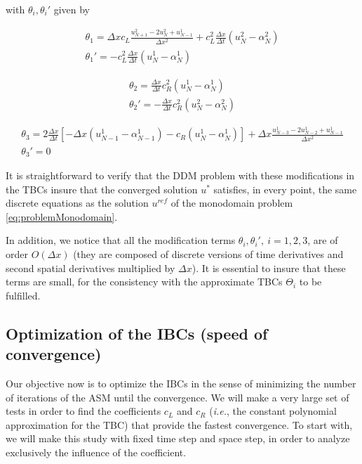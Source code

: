 \noindent with $\theta_i, \theta_i'$ given by

\begin{gather*}
    \theta_1 = \Delta x c_L \frac{u_{N+1}^2 - 2u_{N}^2 + u_{N-1}^1}{\Delta x^2} + c_L^2\frac{\Delta x}{\Delta t} \left( u_{N}^2 - \alpha_{N}^2 \right)\\
    \theta_1' = - c_L^2\frac{\Delta x}{\Delta t} \left( u_{N}^1 - \alpha_{N}^1 \right)
\end{gather*}

\begin{equation*}
\begin{gathered}
    \theta_2 = \frac{\Delta x}{\Delta t} c_R^2 (u_N^1 - \alpha_N^1) \\
    \theta_2' = -\frac{\Delta x}{\Delta t} c_R^2 (u_N^2 - \alpha_N^2)
\end{gathered}
\end{equation*}

\begin{equation*}
\begin{gathered}
    \theta_3 = 2\frac{\Delta x}{\Delta t} \left[-\Delta x(u_{N-1}^1 - \alpha_{N-1}^1) - c_R (u_N^1 - \alpha_N^1) \right] + \Delta x \frac{u_{N-3}^1 - 2u_{N-2}^1 + u_{N-1}^1}{\Delta x^2} \\
    \theta_3' = 0
\end{gathered}
\end{equation*}

\indent It is straightforward to verify that the DDM problem with these modifications in the TBCs insure that the converged solution $u^*$ satisfies, in every point, the same discrete equations as the solution $u^{ref}$ of the monodomain problem \eqref{eq:problemMonodomain}.

\indent In addition, we notice that all the modification terms $\theta_i,\theta_i', \ i = 1,2,3$, are of order $O(\Delta x)$ (they are composed of discrete versions of time derivatives and second spatial derivatives multiplied by $\Delta x$). It is essential to insure that these terms are small, for the consistency with the approximate TBCs $\Theta_i$ to be fulfilled.

\subsection{Optimization of the IBCs (speed of convergence)}

\indent Our objective now is to optimize the IBCs in the sense of minimizing the number of iterations of the ASM until the convergence. We will make a very large set of tests in order to find the coefficients $c_L$ and $c_R$ (\emph{i.e.}, the constant polynomial approximation for the TBC) that provide the fastest convergence. To start with, we will make this study with fixed time step and space step, in order to analyze exclusively the influence of the coefficient.

